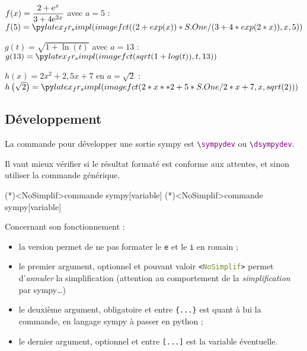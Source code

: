\documentclass[french,a4paper,11pt]{article}
\newcommand\Cle[1]{{\bfseries\sffamily\textlangle #1\textrangle}}
\begin{document}
\begin{bloctext}
$f(x)=\dfrac{2+\mathrm{e}^x}{3+4\mathrm{e}^{2x}}$ avec $a=5$ : $f(5)=\dsympyimage{(2+exp(x))/(3+4*exp(2*x))}{5}$
\end{bloctext}

\begin{bloctext}
$g(t)=\sqrt{1+\ln(t)}$ avec $a=13$ : $g(13)=\sympyimage{sqrt(1+log(t))}[t]{13}$
\end{bloctext}

\begin{bloctext}
$h(x)=2x^2+2,5x+7$ en $a=\sqrt{2}$ : 
$h\left(\sqrt{2}\right)=\dsympyimage{2*x**2+5/2*x+7}{sqrt(2)}$
\end{bloctext}

\subsection{Développement}

\begin{cautionblock}
La commande pour développer une sortie \textsf{sympy} est \texttt{\textbackslash \textcolor{purple}{sympydev}} ou \texttt{\textbackslash \textcolor{purple}{dsympydev}}.

Il vaut mieux vérifier si le résultat formaté est conforme aux attentes, et sinon utiliser la commande générique.
\end{cautionblock}

\begin{bloctext}
\sympydev(*)<NoSimplif>{commande sympy}[variable]
\dsympydev(*)<NoSimplif>{commande sympy}[variable]
\end{bloctext}

\begin{tipblock}
Concernant son fonctionnement :

\begin{itemize}
	\item la version \Cle{*} permet de ne pas formater le \texttt{e} et le \texttt{i} en \textsf{romain} ;
	\item le premier argument, optionnel et pouvant valoir \texttt{<\textcolor{OliveDrab}{NoSimplif}>} permet d'\textit{annuler} la simplification (attention au comportement de la \textit{simplification} par \textsf{sympy}\ldots)
	\item le deuxième argument, obligatoire et entre \texttt{\{...\}} est quant à lui la commande, en langage \textsf{sympy} à passer en \textsf{python} ;
	\item le dernier argument, optionnel et entre \texttt{[...]} est la variable éventuelle.
\end{itemize}
\vspace*{-\baselineskip}\leavevmode
\end{tipblock}
\end{document}
